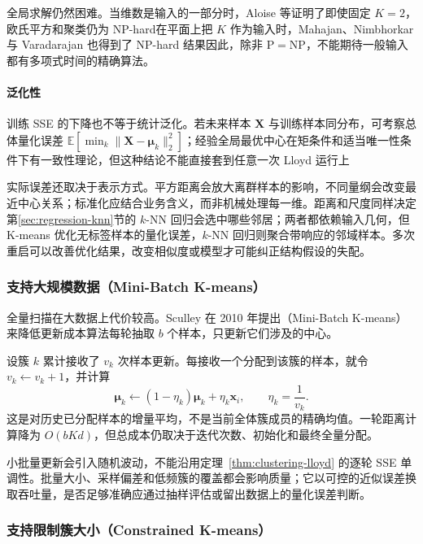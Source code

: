 全局求解仍然困难。当维数是输入的一部分时，Aloise 等证明了即使固定 $K=2$，欧氏平方和聚类仍为 NP-hard在平面上把 $K$ 作为输入时，Mahajan、Nimbhorkar 与 Varadarajan 也得到了 NP-hard 结果因此，除非 $\mathrm{P}=\mathrm{NP}$，不能期待一般输入都有多项式时间的精确算法。

\paragraph{泛化性}
训练 SSE 的下降也不等于统计泛化。若未来样本 $\bm{X}$ 与训练样本同分布，可考察总体量化误差 $\mathbb{E}[\min_k\lVert\bm{X}-\bm{\mu}_k\rVert_2^2]$；经验全局最优中心在矩条件和适当唯一性条件下有一致性理论，但这种结论不能直接套到任意一次 Lloyd 运行上

实际误差还取决于表示方式。平方距离会放大离群样本的影响，不同量纲会改变最近中心关系；标准化应结合业务含义，而非机械处理每一维。距离和尺度同样决定第\ref{sec:regression-knn}节的 $k$-NN 回归会选中哪些邻居；两者都依赖输入几何，但 K-means 优化无标签样本的量化误差，$k$-NN 回归则聚合带响应的邻域样本。多次重启可以改善优化结果，改变相似度或模型才可能纠正结构假设的失配。

\subsubsection{支持大规模数据（Mini-Batch K-means）}

全量扫描在大数据上代价较高。Sculley 在 2010 年提出（Mini-Batch K-means）来降低更新成本算法每轮抽取 $b$ 个样本，只更新它们涉及的中心。

设簇 $k$ 累计接收了 $v_k$ 次样本更新。每接收一个分配到该簇的样本，就令 $v_k\leftarrow v_k+1$，并计算
\begin{equation}
 \bm{\mu}_k\leftarrow
 (1-\eta_k)\bm{\mu}_k+\eta_k\bm{x}_i,
 \qquad \eta_k=\frac{1}{v_k}.
 \label{eq:clustering-minibatch}
\end{equation}
这是对历史已分配样本的增量平均，不是当前全体簇成员的精确均值。一轮距离计算降为 $O(bKd)$，但总成本仍取决于迭代次数、初始化和最终全量分配。

小批量更新会引入随机波动，不能沿用定理~\ref{thm:clustering-lloyd} 的逐轮 SSE 单调性。批量大小、采样偏差和低频簇的覆盖都会影响质量；它以可控的近似误差换取吞吐量，是否足够准确应通过抽样评估或留出数据上的量化误差判断。

\subsubsection{支持限制簇大小（Constrained K-means）}
\label{sec:clustering-capacity}

